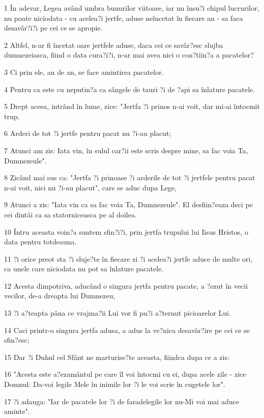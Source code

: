 \par 1 În adevar, Legea având umbra bunurilor viitoare, iar nu însu?i chipul lucrurilor, nu poate niciodata - cu acelea?i jertfe, aduse neîncetat în fiecare an - sa faca desavâr?i?i pe cei ce se apropie.
\par 2 Altfel, n-ar fi încetat oare jertfele aduse, daca cei ce savâr?esc slujba dumnezeiasca, fiind o data cura?i?i, n-ar mai avea nici o con?tiin?a a pacatelor?
\par 3 Ci prin ele, an de an, se face amintirea pacatelor.
\par 4 Pentru ca este cu neputin?a ca sângele de tauri ?i de ?api sa înlature pacatele.
\par 5 Drept aceea, intrând în lume, zice: "Jertfa ?i prinos n-ai voit, dar mi-ai întocmit trup.
\par 6 Arderi de tot ?i jertfe pentru pacat nu ?i-au placut;
\par 7 Atunci am zis: Iata vin, în sulul car?ii este scris despre mine, sa fac voia Ta, Dumnezeule".
\par 8 Zicând mai sus ca: "Jertfa ?i prinoase ?i arderile de tot ?i jertfele pentru pacat n-ai voit, nici nu ?i-au placut", care se aduc dupa Lege,
\par 9 Atunci a zis: "Iata vin ca sa fac voia Ta, Dumnezeule". El desfiin?eaza deci pe cei dintâi ca sa statorniceasca pe al doilea.
\par 10 Întru aceasta voin?a suntem sfin?i?i, prin jertfa trupului lui Iisus Hristos, o data pentru totdeauna.
\par 11 ?i orice preot sta ?i sluje?te în fiecare zi ?i acelea?i jertfe aduce de multe ori, ca unele care niciodata nu pot sa înlature pacatele.
\par 12 Acesta dimpotriva, aducând o singura jertfa pentru pacate, a ?ezut în vecii vecilor, de-a dreapta lui Dumnezeu,
\par 13 ?i a?teapta pâna ce vrajma?ii Lui vor fi pu?i a?ternut picioarelor Lui.
\par 14 Caci printr-o singura jertfa adusa, a adus la ve?nica desavâr?ire pe cei ce se sfin?esc;
\par 15 Dar ?i Duhul cel Sfânt ne marturise?te aceasta, fiindca dupa ce a zis:
\par 16 "Acesta este a?ezamântul pe care îl voi întocmi cu ei, dupa acele zile - zice Domnul: Da-voi legile Mele în inimile lor ?i le voi scrie în cugetele lor".
\par 17 ?i adauga: "Iar de pacatele lor ?i de faradelegile lor nu-Mi voi mai aduce aminte".
